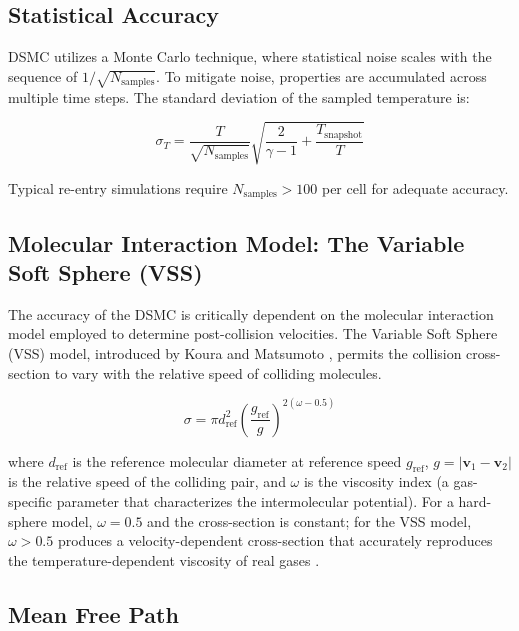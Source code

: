 \subsection{Statistical Accuracy}

DSMC utilizes a Monte Carlo technique, where statistical noise scales with the sequence of $1/\sqrt{N_{\text{samples}}}$. To mitigate noise, properties are accumulated across multiple time steps. The standard deviation of the sampled temperature is:

\begin{equation}
    \sigma_T = \frac{T}{\sqrt{N_{\text{samples}}}} \sqrt{\frac{2}{\gamma - 1} + \frac{T_{\text{snapshot}}}{T}}
    \label{eq:dsmc_noise}
\end{equation}

\noindent Typical re-entry simulations require $N_{\text{samples}} > 100$ per cell for adequate accuracy.

\subsection{Molecular Interaction Model: The Variable Soft Sphere (VSS)}

The accuracy of the DSMC is critically dependent on the molecular interaction model employed to determine post-collision velocities. The Variable Soft Sphere (VSS) model, introduced by Koura and Matsumoto \cite{bird1994molecular}, permits the collision cross-section to vary with the relative speed of colliding molecules.

\begin{equation}
    \sigma = \pi d_{\text{ref}}^2 \left( \frac{g_{\text{ref}}}{g} \right)^{2(\omega - 0.5)}
    \label{eq:vss_cross_section}
\end{equation}

\noindent where $d_{\text{ref}}$ is the reference molecular diameter at reference speed $g_{\text{ref}}$, $g = |\mathbf{v}_1 - \mathbf{v}_2|$ is the relative speed of the colliding pair, and $\omega$ is the viscosity index (a gas-specific parameter that characterizes the intermolecular potential). For a hard-sphere model, $\omega = 0.5$ and the cross-section is constant; for the VSS model, $\omega > 0.5$ produces a velocity-dependent cross-section that accurately reproduces the temperature-dependent viscosity of real gases \cite{bird1994molecular}.

\subsection{Mean Free Path}

